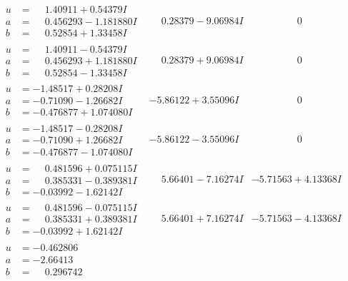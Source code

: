 \documentclass[1p]{elsarticle_modified}
\theoremstyle{definition}
\begin{document}
$$\begin{array}{c|c|c}
\begin{aligned}
u &= \phantom{-}1.40911 + 0.54379 I \\
a &= \phantom{-}0.456293 - 1.181880 I \\
b &= \phantom{-}0.52854 + 1.33458 I\end{aligned}
 & \phantom{-}0.28379 - 9.06984 I & \phantom{-0.000000 } 0 \\ \hline\begin{aligned}
u &= \phantom{-}1.40911 - 0.54379 I \\
a &= \phantom{-}0.456293 + 1.181880 I \\
b &= \phantom{-}0.52854 - 1.33458 I\end{aligned}
 & \phantom{-}0.28379 + 9.06984 I & \phantom{-0.000000 } 0 \\ \hline\begin{aligned}
u &= -1.48517 + 0.28208 I \\
a &= -0.71090 - 1.26682 I \\
b &= -0.476877 + 1.074080 I\end{aligned}
 & -5.86122 + 3.55096 I & \phantom{-0.000000 } 0 \\ \hline\begin{aligned}
u &= -1.48517 - 0.28208 I \\
a &= -0.71090 + 1.26682 I \\
b &= -0.476877 - 1.074080 I\end{aligned}
 & -5.86122 - 3.55096 I & \phantom{-0.000000 } 0 \\ \hline\begin{aligned}
u &= \phantom{-}0.481596 + 0.075115 I \\
a &= \phantom{-}0.385331 - 0.389381 I \\
b &= -0.03992 - 1.62142 I\end{aligned}
 & \phantom{-}5.66401 - 7.16274 I & -5.71563 + 4.13368 I \\ \hline\begin{aligned}
u &= \phantom{-}0.481596 - 0.075115 I \\
a &= \phantom{-}0.385331 + 0.389381 I \\
b &= -0.03992 + 1.62142 I\end{aligned}
 & \phantom{-}5.66401 + 7.16274 I & -5.71563 - 4.13368 I \\ \hline\begin{aligned}
u &= -0.462806\phantom{ +0.000000I} \\
a &= -2.66413\phantom{ +0.000000I} \\
b &= \phantom{-}0.296742\phantom{ +0.000000I}\end{aligned}

\end{array}$$
\end{document}
